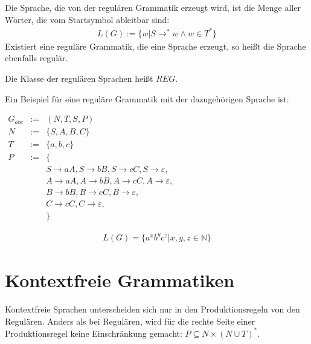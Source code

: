 \documentclass[a4paper,12pt]{report}
\begin{document}
Die Sprache, die von der regulären Grammatik erzeugt wird, ist die Menge aller Wörter, die vom Startsymbol ableitbar sind: 
\begin{eqnarray}
  L(G) := \{w | S \rightarrow^* w \land w\in T^* \} 
\end{eqnarray}
Existiert eine reguläre Grammatik, die eine Sprache erzeugt, so heißt die Sprache ebenfalls regulär.

Die Klasse der regulären Sprachen heißt $REG$.

Ein Beispiel für eine reguläre Grammatik mit der dazugehörigen Sprache ist: 

\begin{center}
 $
\begin{array}{rcl}
  G_{abc} &:=& (N,T,S,P) \\
  N &:=& \{ S, A, B, C \} \\
  T &:=& \{ a, b, c \} \\
  P &:=& \{ \\ 
  &&  S \rightarrow a A,
    S \rightarrow b B,
    S \rightarrow c C,
    S \rightarrow \varepsilon,\\
  &&  A \rightarrow a A,
    A \rightarrow b B,
    A \rightarrow c C,
    A \rightarrow \varepsilon,\\
  &&  B \rightarrow b B,
    B \rightarrow c C,
    B \rightarrow \varepsilon, \\
  &&  C \rightarrow c C,
    C \rightarrow \varepsilon,\\
  &&\}
\end{array}
\label{regGramEx}
$ 
\end{center}

\begin{eqnarray}
  L(G) = \{ a^xb^yc^z | x,y,z\in \mathbb{N} \} 
\end{eqnarray}



\section{Kontextfreie Grammatiken}
\label{cfGram}

Kontextfreie Sprachen unterscheiden sich nur in den Produktionsregeln von den Regulären. Anders als bei Regulären, wird für die rechte Seite einer Produktionsregel keine Einschränkung gemacht: $P \subseteq N\times (N\cup T)^*$.

% 
\end{document}
